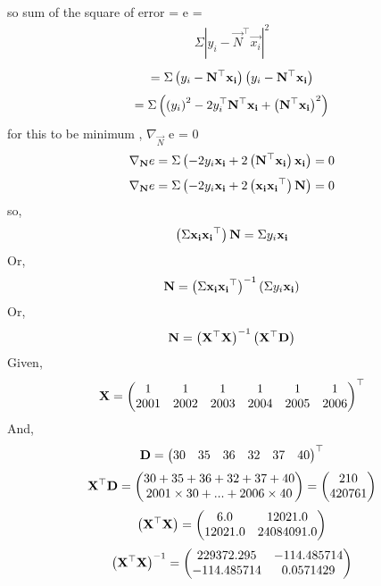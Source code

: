 \documentclass{beamer}
\numberwithin{equation}{section}
\begin{document}
		so sum of the square of error = e =
		\begin{align}
				\Sigma|y_i - \vec{N}^\top\vec{x_i}|^2
		\end{align}
		\begin{align}
		=		\Sigma\left(y_i - \mathbf{N}^\top\mathbf{x_i}\right)\left(y_i - \mathbf{N}^\top\mathbf{x_i}\right)
		\end{align}
		\begin{align}
				=		\Sigma\left(\left(y_i\right)^2 - 2y_i^\top\mathbf{N}^\top\mathbf{x_i} + \left(\mathbf{N}^\top\mathbf{x_i}\right)^2\right)
		\end{align}
		for this to be minimum , $\nabla_\vec{N}$ e = 0
		\begin{align}
		\nabla_{\mathbf{N}} e=\Sigma\left(- 2y_i\mathbf{x_i} + 2\left(\mathbf{N}^\top\mathbf{x_i}\right)\mathbf{x_i}\right)=0
		\end{align}
		\begin{align}
		\nabla_{\mathbf{N}} e=\Sigma\left(- 2y_i\mathbf{x_i} + 2\left(\mathbf{x_i}\mathbf{x_i}^\top\right)\mathbf{N}\right)=0
		\end{align}
		so,
		\begin{align}
				\left(\Sigma\mathbf{x_i}\mathbf{x_i}^\top\right)\mathbf{N} = \Sigma y_i\mathbf{x_i}
		\end{align}Or,
		\begin{align}
				\mathbf{N} = \left(\Sigma\mathbf{x_i}\mathbf{x_i}^\top\right)^{-1}\left(\Sigma y_i\mathbf{x_i}\right)
		\end{align}Or,
		\begin{align}
				\mathbf{N} = \left(\mathbf{X}^\top\mathbf{X}\right)^{-1}\left(\mathbf{X}^\top\mathbf{D}\right)
		\end{align}
		Given,\begin{align}
		\mathbf{X} = \begin{pmatrix}1&1&1&1&1&1\\2001&2002&2003&2004&2005&2006\end{pmatrix}^\top
		\end{align}
		And,\begin{align}
		\mathbf{D} = \begin{pmatrix}30&35&36&32&37&40\end{pmatrix}^\top
		\end{align}
		\begin{align}
				\mathbf{X}^\top\mathbf{D} = \begin{pmatrix}30+35+36+32+37+40 \\ 2001\times30 + ... + 2006\times40\end{pmatrix} = \begin{pmatrix}210 \\ 420761\end{pmatrix}
		\end{align}
		\begin{align}
				\left(\mathbf{X}^\top\mathbf{X}\right) = \begin{pmatrix}6.0 & 12021.0 \\
12021.0 & 24084091.0\end{pmatrix}
		\end{align}
		\begin{align}
				\left(\mathbf{X}^\top\mathbf{X}\right)^{-1} = \begin{pmatrix}229372.295 & -114.485714 \\
-114.485714 & 0.0571429\end{pmatrix}
		\end{align}
\end{document}
